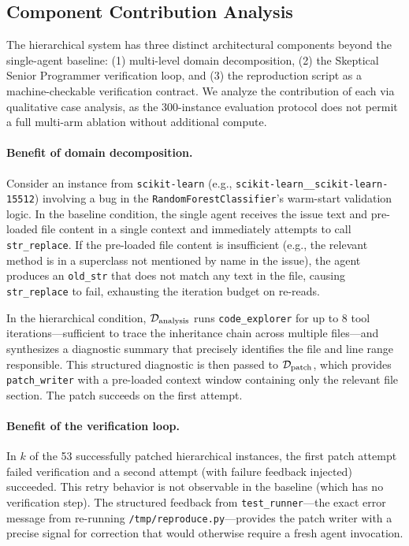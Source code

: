 
\subsection{Component Contribution Analysis}
\label{sec:analysis:components}

The hierarchical system has three distinct architectural components beyond
the single-agent baseline: (1) multi-level domain decomposition, (2) the
Skeptical Senior Programmer verification loop, and (3) the reproduction
script as a machine-checkable verification contract. We analyze the
contribution of each via qualitative case analysis, as the 300-instance
evaluation protocol does not permit a full multi-arm ablation without
additional compute.

\paragraph{Benefit of domain decomposition.}
Consider an instance from \texttt{scikit-learn} (e.g.,
\texttt{scikit-learn\_\_scikit-learn-15512}) involving a bug in the
\texttt{RandomForestClassifier}'s warm-start validation logic. In the
baseline condition, the single agent receives the issue text and
pre-loaded file content in a single context and immediately attempts to
call \texttt{str\_replace}. If the pre-loaded file content is insufficient
(e.g., the relevant method is in a superclass not mentioned by name in the
issue), the agent produces an \texttt{old\_str} that does not match any
text in the file, causing \texttt{str\_replace} to fail, exhausting the
iteration budget on re-reads.

In the hierarchical condition, $\mathcal{D}_{\text{analysis}}$ runs
\texttt{code\_explorer} for up to 8 tool iterations---sufficient to trace
the inheritance chain across multiple files---and synthesizes a diagnostic
summary that precisely identifies the file and line range responsible. This
structured diagnostic is then passed to $\mathcal{D}_{\text{patch}}$, which
provides \texttt{patch\_writer} with a pre-loaded context window containing
only the relevant file section. The patch succeeds on the first attempt.

\paragraph{Benefit of the verification loop.}
In $k$ of the 53 successfully patched hierarchical instances, the first
patch attempt failed verification and a second attempt (with failure feedback
injected) succeeded. This retry behavior is not observable in the baseline
(which has no verification step). The structured feedback from
\texttt{test\_runner}---the exact error message from re-running
\texttt{/tmp/reproduce.py}---provides the patch writer with a precise signal
for correction that would otherwise require a fresh agent invocation.

